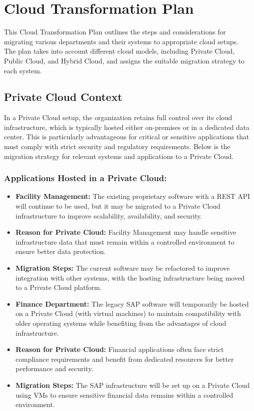 \section{Cloud Transformation Plan}

This Cloud Transformation Plan outlines the steps and considerations for migrating various departments and their systems to appropriate cloud setups. The plan takes into account different cloud models, including Private Cloud, Public Cloud, and Hybrid Cloud, and assigns the suitable migration strategy to each system.

\subsection{Private Cloud Context}

In a Private Cloud setup, the organization retains full control over its cloud infrastructure, which is typically hosted either on-premises or in a dedicated data center. This is particularly advantageous for critical or sensitive applications that must comply with strict security and regulatory requirements. Below is the migration strategy for relevant systems and applications to a Private Cloud.

\subsubsection{Applications Hosted in a Private Cloud:}

\begin{itemize}
    \item \textbf{Facility Management:} The existing proprietary software with a REST API will continue to be used, but it may be migrated to a Private Cloud infrastructure to improve scalability, availability, and security.
    \item \textbf{Reason for Private Cloud:} Facility Management may handle sensitive infrastructure data that must remain within a controlled environment to ensure better data protection.
    \item \textbf{Migration Steps:} The current software may be refactored to improve integration with other systems, with the hosting infrastructure being moved to a Private Cloud platform.
    \item \textbf{Finance Department:} The legacy SAP software will temporarily be hosted on a Private Cloud (with virtual machines) to maintain compatibility with older operating systems while benefiting from the advantages of cloud infrastructure.
    \item \textbf{Reason for Private Cloud:} Financial applications often face strict compliance requirements and benefit from dedicated resources for better performance and security.
    \item \textbf{Migration Steps:} The SAP infrastructure will be set up on a Private Cloud using VMs to ensure sensitive financial data remains within a controlled environment.
\end{itemize}

